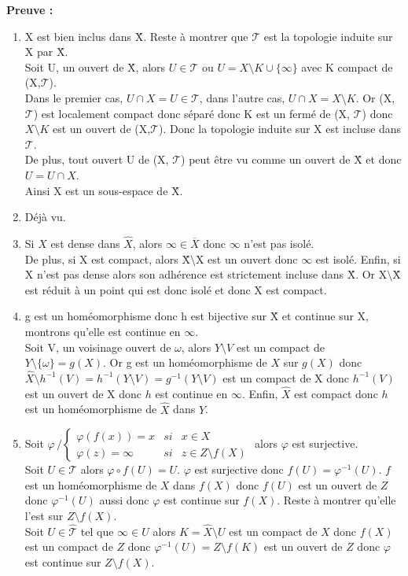 \documentclass{report}
\theoremstyle{plain}
\newcommand\T{\mathcal{T}}
\newcommand\X{\hat{X}}
\begin{document}
		\textbf{Preuve :} 
			\begin{enumerate}
				\item X est bien inclus dans \^X. Reste à montrer que $\T$ est la topologie induite sur X par \^X.\\
				Soit U, un ouvert de \^X, alors $U \in \T$ ou $U = X\setminus K \cup \{\infty\}$ avec K compact de (X,$\T$).\\
				Dans le premier cas, $U\cap X = U \in \T$, dans l'autre cas, $U\cap X = X\setminus K$. Or (X, $\T$) est localement compact donc séparé donc K est un fermé de (X, $\T$) donc $X\setminus K$ est un ouvert de (X,$\T$). Donc la topologie induite sur X est incluse dans $\T$.\\
				De plus, tout ouvert U de (X, $\T$) peut être vu comme un ouvert de \^X et donc $U = U\cap X$.\\
				Ainsi X est un sous-espace de \^X.
				\item Déjà vu.
				\item Si $X$ est dense dans $\hat{X}$, alors $\infty \in \overline{X}$ donc $\infty$ n'est pas isolé.\\
				De plus, si X est compact, alors \^X$\setminus$X est un ouvert donc $\infty$ est isolé.
				Enfin, si X n'est pas dense alors son adhérence est strictement incluse dans \^X. Or X$\setminus$\^X est réduit à un point qui est donc isolé et donc X est compact.
				\item g est un homéomorphisme donc h est bijective sur \^X et continue sur X, montrons qu'elle est continue en $\infty$.\\
				Soit V, un voisinage ouvert de $\omega$, alors $Y\setminus V$ est un compact de $Y\setminus\{\omega\} = g(X)$. Or g est un homéomorphisme de $X$ sur $g(X)$ donc $\hat{X}\setminus h^{-1}(V) = h^{-1}(Y\setminus V) = g^{-1}(Y\setminus V)$ est un compact de X donc $h^{-1}(V)$ est un ouvert de X donc $h$ est continue en $\infty$. Enfin, $\hat{X}$ est compact donc $h$ est un homéomorphisme de $\hat{X}$ dans $Y$.
				\item Soit $\varphi\,/\left\{
					\begin{array}{lll}
						\varphi(f(x)) = x & si & x\in X\\
						\varphi(z) = \infty & si & z\in Z\setminus f(X)
					\end{array}
					\right.$ alors $\varphi$ est surjective.\\
					Soit $U\in \T$ alors $\varphi\circ f(U) = U$. $\varphi$ est surjective donc $f(U) = \varphi^{-1}(U)$. $f$ est un homéomorphisme de $X$ dans $f(X)$ donc $f(U)$ est un ouvert de $Z$ donc $\varphi^{-1}(U)$ aussi donc $\varphi$ est continue sur $f(X)$. Reste à montrer qu'elle l'est sur $Z\setminus f(X)$.\\
					Soit $U\in\hat{\T}$ tel que $\infty\in U$ alors $K=\X\setminus U$ est un compact de $X$ donc $f(X)$ est un compact de $Z$ donc $\varphi^{-1}(U)=Z\setminus f(K)$ est un ouvert de $Z$ donc $\varphi$ est continue sur $Z\setminus f(X)$.
			\end{enumerate}
\end{document}
